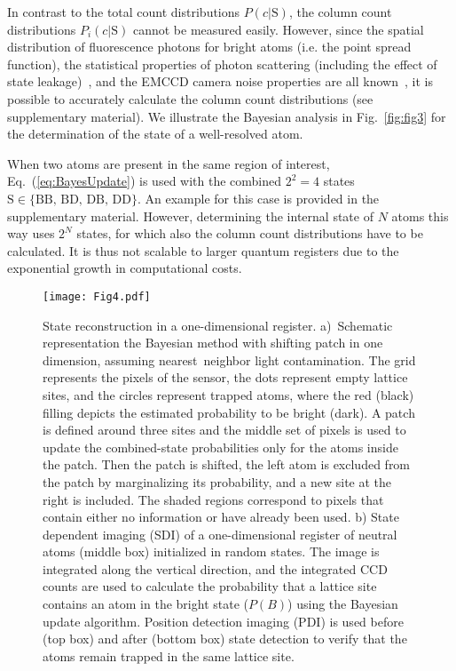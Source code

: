 \documentclass[aps,prl,twocolumn,english,showpacs]{revtex4-1}
\begin{document}
In contrast to the total count distributions $P(c|\text{S})$, the column count distributions $P_{i}(c|\text{S})$ cannot be measured easily. However, since the spatial distribution of fluorescence photons for bright atoms (i.e. the point spread function), the statistical properties of photon scattering (including the effect of state leakage)~\cite{acton2006}, and the EMCCD camera noise properties are all known~\cite{Robbins2011,citeulike:10216617}, it is possible to accurately calculate the column count distributions (see supplementary material). We illustrate the Bayesian analysis in Fig.~\ref{fig:fig3} for the determination of the state of a well-resolved atom. 

When two atoms are present in the same region of interest, Eq.~(\ref{eq:BayesUpdate}) is used with the combined $2^2=4$ states $\text{S} \in \{\text{BB, BD, DB, DD}\}$. An example for this case is provided in the supplementary material. However, determining the internal state of $N$ atoms this way uses $2^N$ states, for which also the column count distributions have to be calculated. It is thus not scalable to larger quantum registers due to the exponential growth in computational costs.

\begin{figure}[t]
  \texttt{[image: Fig4.pdf]}
  \caption{State reconstruction in a one-dimensional \textcolor{MyRED1}{register}. a)~Schematic representation the Bayesian method with shifting patch in one dimension, assuming nearest~neighbor light contamination. The grid represents the pixels of the sensor, the dots represent empty lattice sites, and the circles represent trapped atoms, where the red (black) filling depicts the estimated probability to be bright (dark). A patch is defined around three sites and the middle set of pixels is used to update the combined-state probabilities only for the atoms inside the patch. Then the patch is shifted, the left atom is excluded from the patch by marginalizing its probability, and a new site at the right is included. The shaded regions correspond to pixels that contain either no information or have already been used. b) State dependent imaging (SDI) of a one-dimensional register of neutral atoms (middle box) initialized in random states. The image is integrated along the vertical direction, and the integrated CCD counts are used to calculate the probability that a lattice site contains an atom in the bright state ($P(B)$) using the Bayesian update algorithm. Position detection imaging (PDI) is used before (top box) and after (bottom box) state detection to verify that the atoms remain trapped in the same lattice site.}  {\label{fig:fig4}}
\end{figure}
\end{document}
